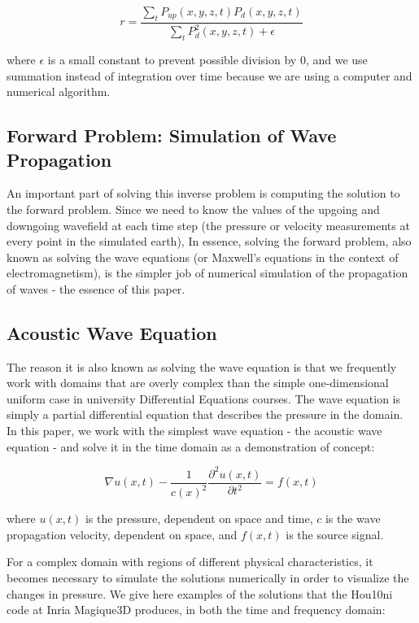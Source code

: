 $$r = \frac{\sum\limits_t P_{up}(x,y,z,t) P_d(x,y,z,t)}{\sum\limits_t P_d^2(x,y,z,t) + \epsilon}$$ 

where $\epsilon$ is a small constant to prevent possible division by $0$, and we use summation instead of integration over time because we are using a computer and numerical algorithm.



\subsection{Forward Problem: Simulation of Wave Propagation}

An important part of solving this inverse problem is computing the solution to the forward problem. Since we need to know the values of the upgoing and downgoing wavefield at each time step (the pressure or velocity measurements at every point in the simulated earth), In essence, solving the forward problem, also known as solving the wave equations (or Maxwell's equations in the context of electromagnetism), is the simpler job of numerical simulation of the propagation of waves - the essence of this paper. 


\subsection{Acoustic Wave Equation}

The reason it is also known as solving the wave equation is that we frequently work with domains that are overly complex than the simple one-dimensional uniform case in university Differential Equations courses. The wave equation is simply a partial differential equation that describes the pressure in the domain. In this paper, we work with the simplest wave equation - the acoustic wave equation - and solve it in the time domain as a demonstration of concept:

$$\nabla u(x,t) - \frac{1}{c(x)^2} \frac{\partial^2 u(x,t)}{\partial t^2} = f(x,t)$$

where $u(x,t)$ is the pressure, dependent on space and time, $c$ is the wave propagation velocity, dependent on space, and $f(x,t)$ is the source signal.


For a complex domain with regions of different physical characteristics, it becomes necessary to simulate the solutions numerically in order to visualize the changes in pressure. We give here examples of the solutions that the Hou10ni code at Inria Magique3D produces, in both the time and frequency domain: 

